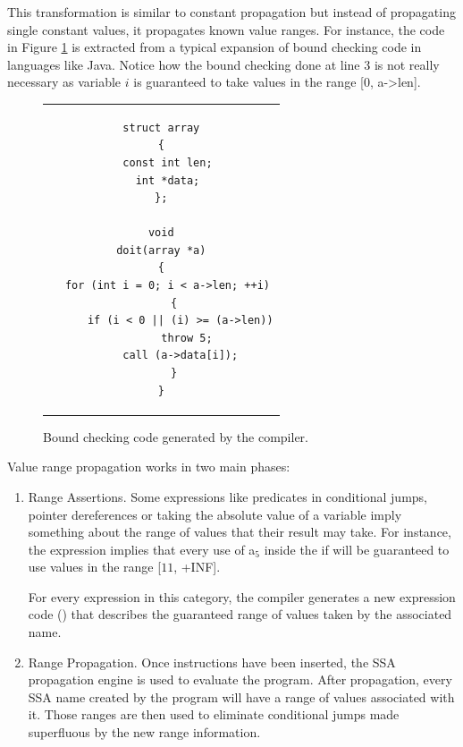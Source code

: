 This transformation is similar to constant propagation but
instead of propagating single constant values, it propagates
known value ranges.  For instance, the code in Figure
\ref{novillo:fig:vrp-1} is extracted from a typical expansion of
bound checking code in languages like Java. Notice how the bound
checking done at line 3 is not really necessary as variable $i$
is guaranteed to take values in the range [$0$, a->len].

\begin{figure}
  \begin{center}
    \begin{tabular}{c}
      \begin{lstlisting}
struct array
{
  const int len;
  int *data;
};

void
doit(array *a)
{
  for (int i = 0; i < a->len; ++i)
    {
      if (i < 0 || (i) >= (a->len))
        throw 5;
      call (a->data[i]);
    }
}
      \end{lstlisting}
    \end{tabular}
  \end{center}
  \caption{Bound checking code generated by the compiler.}
  \label{novillo:fig:vrp-1}
\end{figure}

Value range propagation works in two main phases:

\begin{enumerate}
\item	Range Assertions.  Some expressions like predicates in
	conditional jumps, pointer dereferences or taking the
	absolute value of a variable imply something about the
	range of values that their result may take.  For
	instance, the expression 
	implies that every use of a$_5$ inside the if will be
	guaranteed to use values in the range [$11$, +INF].

	For every expression in this category, the compiler
	generates a new expression code ()
	that describes the guaranteed range of values taken by
	the associated name.

\item	Range Propagation.  Once  instructions
	have been inserted, the SSA propagation engine is used to
	evaluate the program.  After propagation, every SSA name
	created by the program will have a range of values
	associated with it.  Those ranges are then used to
	eliminate conditional jumps made superfluous by the new
	range information.
\end{enumerate}

